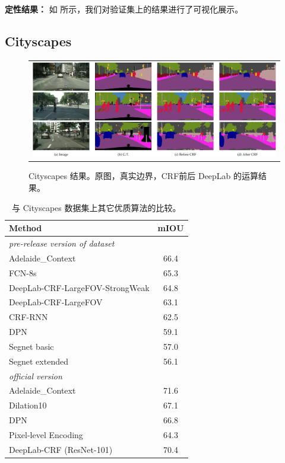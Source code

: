 \textbf{定性结果：} 如  所示，我们对验证集上的结果进行了可视化展示。

\subsection{Cityscapes}
\label{exp:cityscapes}

\begin{figure}[!t]
  \centering
  \scalebox{1} {
  \begin{tabular}{c}
    \includegraphics[width=0.9\linewidth]{fig/cityscapes/results.jpg} \\
  \end{tabular}
  }
  \caption{Cityscapes 结果。原图，真实边界，CRF前后 DeepLab 的运算结果。}
  \label{fig:cityscapes_val_results}
\end{figure}


\begin{table}[!t]
  \centering
  \addtolength{\tabcolsep}{2.5pt}
  \begin{tabular}{l | c}
    \toprule[0.2 em]
    {\bf Method} & {\bf mIOU} \\
    \toprule[0.2 em]
    \multicolumn{2}{l}{\it pre-release version of dataset} \\
    Adelaide\_Context \cite{lin2015efficient} & 66.4 \\
    FCN-8s \cite{long2014fully} & 65.3 \\
    \midrule
    DeepLab-CRF-LargeFOV-StrongWeak \cite{papandreou2015weakly} & 64.8 \\
    DeepLab-CRF-LargeFOV \cite{chen2014semantic} & 63.1 \\
    \midrule
    CRF-RNN \cite{zheng2015conditional} & 62.5 \\
    DPN \cite{liu2015semantic} & 59.1 \\
    Segnet basic \cite{badrinarayanan2015segnet} & 57.0 \\
    Segnet extended \cite{badrinarayanan2015segnet} & 56.1 \\
    \midrule \midrule
    \multicolumn{2}{l}{\it official version} \\
    Adelaide\_Context \cite{lin2015efficient} & 71.6 \\
    Dilation10 \cite{yu2015multi} & 67.1 \\
    DPN \cite{liu2015semantic} & 66.8  \\
    Pixel-level Encoding \cite{uhrig2016pixel} & 64.3 \\
    \midrule
    DeepLab-CRF (ResNet-101) & 70.4 \\
    \bottomrule[0.1 em]
  \end{tabular}
  \caption{与 Cityscapes 数据集上其它优质算法的比较。}
  \label{tab:cityscapes_test}
\end{table}

